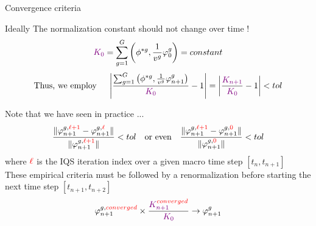 \documentclass[8pt]{beamer}
\newcommand{\tcr}[1]{\textcolor{red}{#1}}
\newcommand{\tcp}[1]{\textcolor{violet}{#1}}
\begin{document}
\begin{frame}{Convergence criteria}


\begin{block}{Ideally}
The normalization constant should not change over time !
\[
\tcp{K_0} = \sum_{g=1}^G\left(\phi^{*g},\frac{1}{v^g}\varphi^g_0\right)= constant
\]
\[
\text{Thus, we employ }\quad
\left| \frac{\sum_{g=1}^G\left(\phi^{*g},\frac{1}{v^g}\varphi^g_{n+1}\right)}{\tcp{K_0}}-1\right| 
= \left| \frac{\tcp{K_{n+1}}}{{\tcp{K_0}}}-1\right|  < tol
\]
\end{block}

\begin{block}{Note that we have seen in practice ... }
\[
\frac{ \| \varphi^{g,\tcr{\ell+1}}_{n+1} - \varphi^{g,\tcr{\ell}}_{n+1} \|}{\| \varphi^{g,\tcr{\ell+1}}_{n+1} \|} < tol 
\quad \text{or even} \quad
\frac{ \| \varphi^{g,\tcr{\ell+1}}_{n+1} - \varphi^{g,\tcr{0}}_{n+1} \|}{\| \varphi^{g,\tcr{0}}_{n+1} \|} < tol 
\]
where $\tcr{\ell}$ is the IQS iteration index over a given macro time step $[t_n,t_{n+1}]$\\
\smallskip
These empirical criteria must be followed by a renormalization before starting the next time step $[t_{n+1},t_{n+2}]$
\[
 \varphi^{g,\tcr{converged}}_{n+1} \times \frac{\tcp{K_{n+1}^{\tcr{converged}}}}{\tcp{K_0}} \rightarrow \varphi^{g}_{n+1}
\]
\end{block}


\end{frame}
\end{document}
